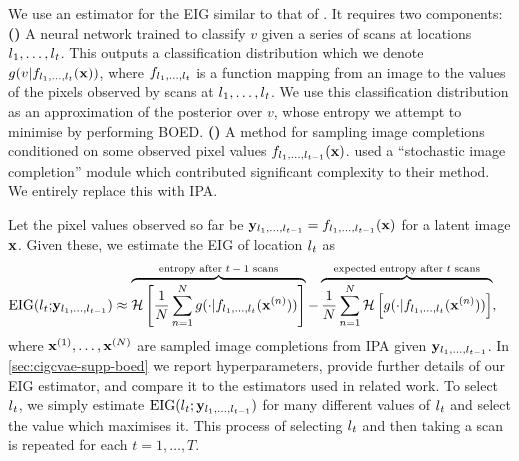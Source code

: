 We use an estimator for the EIG similar to that of \citet{harvey2019near}. It
requires two components:
\textbf{()} A neural network trained to classify $v$ given a series of
scans at locations $l{}_1,\ldots,l{}_t$. This outputs a classification distribution
which we denote $g(v|f_{l{}_1,\ldots,l{}_t}({\mathbf{x}}))$, where $f_{l{}_1,\ldots,l{}_t}$ is a
function mapping from an image to the values of the pixels observed by scans at
$l{}_1,\ldots,l{}_t$. We use this classification distribution as an approximation of
the posterior over $v$, whose entropy we attempt to minimise by performing BOED.
\textbf{()} A method for sampling image completions conditioned on some
observed pixel values $f_{l{}_1,\ldots,l{}_{t-1}}({\mathbf{x}})$. \citet{harvey2019near}
used a “stochastic image completion” module which contributed significant
complexity to their method. We entirely replace this with IPA.

Let the pixel values observed so far be ${\mathbf{y}}_{l{}_1,\ldots,l{}_{t-1}} =
f_{l{}_1,\ldots,l{}_{t-1}}({\mathbf{x}})$ for a latent image ${\mathbf{x}}$. Given these, we
estimate the EIG of location $l{}_t$ as
\begin{align}
  \label{eq:new-eig}
  \text{EIG}(l{}_t;& {\mathbf{y}}_{l{}_1,\ldots,l{}_{t-1}}) \approx \overbrace{\mathcal{H} \left[ \frac{1}{N} \sum_{n=1}^N g(\cdot|f_{l{}_1,\ldots,l{}_t}({\mathbf{x}}^{(n)})) \right]}^{\text{entropy after $t-1$ scans}} - \overbrace{\frac{1}{N} \sum_{n=1}^N  \mathcal{H} \left[ g(\cdot|f_{l{}_1,\ldots,l{}_t}({\mathbf{x}}^{(n)})) \right]}^{\text{expected entropy after $t$ scans}},
\end{align}
where ${\mathbf{x}}^{(1)},\ldots,{\mathbf{x}}^{(N)}$ are sampled image completions from IPA
given ${\mathbf{y}}_{l{}_1,\ldots,l{}_{t-1}}$. In \cref{sec:cigcvae-supp-boed} we report
hyperparameters, provide further details of our EIG estimator, and compare it to
the estimators used in related work. To select $l{}_t$, we simply estimate
$\text{EIG}(l{}_t; {\mathbf{y}}_{l{}_1,\ldots,l{}_{t-1}})$ for many different values of
$l{}_t$ and select the value which maximises it. This process of selecting $l{}_t$
and then taking a scan is repeated for each $t=1,\ldots,T$.

